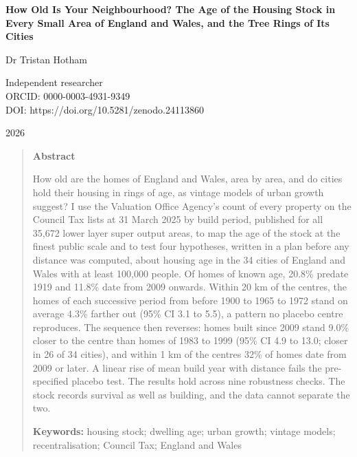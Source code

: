 \documentclass[11pt,a4paper]{article}
\begin{document}
\begin{center}
{\Large\bfseries How Old Is Your Neighbourhood? The Age of the Housing Stock in Every Small Area of England and Wales, and the Tree Rings of Its Cities\par}
\vspace{1.2em}
{\large Dr Tristan Hotham\par}
\vspace{0.3em}
{\small Independent researcher\\
ORCID: 0000-0003-4931-9349\\
DOI: https://doi.org/10.5281/zenodo.24113860\par}
\vspace{0.8em}
2026
\end{center}

\begin{quote}
\small
\begin{center}\textbf{Abstract}\end{center}
How old are the homes of England and Wales, area by area, and do cities hold their housing in rings of age, as vintage models of urban growth suggest? I use the Valuation Office Agency's count of every property on the Council Tax lists at 31 March 2025 by build period, published for all 35,672 lower layer super output areas, to map the age of the stock at the finest public scale and to test four hypotheses, written in a plan before any distance was computed, about housing age in the 34 cities of England and Wales with at least 100,000 people. Of homes of known age, 20.8\% predate 1919 and 11.8\% date from 2009 onwards. Within 20 km of the centres, the homes of each successive period from before 1900 to 1965 to 1972 stand on average 4.3\% farther out (95\% CI 3.1 to 5.5), a pattern no placebo centre reproduces. The sequence then reverses: homes built since 2009 stand 9.0\% closer to the centre than homes of 1983 to 1999 (95\% CI 4.9 to 13.0; closer in 26 of 34 cities), and within 1 km of the centres 32\% of homes date from 2009 or later. A linear rise of mean build year with distance fails the pre-specified placebo test. The results hold across nine robustness checks. The stock records survival as well as building, and the data cannot separate the two.

\textbf{Keywords:} housing stock; dwelling age; urban growth; vintage models; recentralisation; Council Tax; England and Wales
\end{quote}
\end{document}

